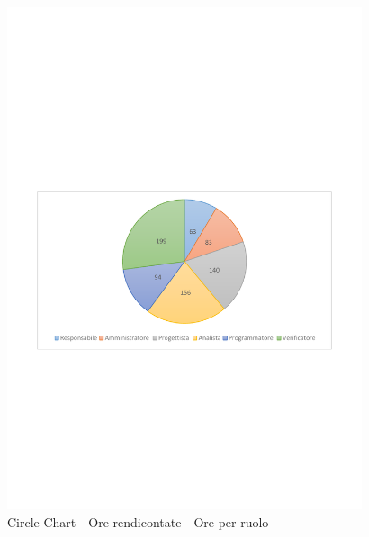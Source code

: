 \documentclass[../PianoProgetto.tex]{subfiles}
\begin{document}
	\begin{figure}[!h]
		\centering
		\includegraphics[width=0.93\textwidth , trim=2cm 9.5cm 2cm 11cm]{grafici/Riepilogo/Rendicontate/ore-ruolo}
			\caption{Circle Chart - Ore rendicontate - Ore per ruolo}
		\label{fig:CircleChart-rendicontate_ore_r}
	\end{figure}
\vfill			
\end{document}
